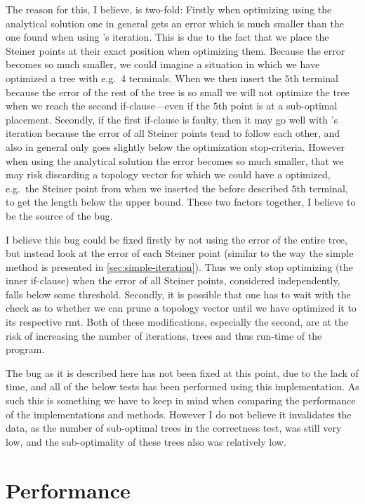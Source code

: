 The reason for this, I believe, is two-fold: Firstly when optimizing using the
analytical solution one in general gets an error which is much smaller than the
one found when using \citeauthor{smith1992}'s iteration. This is due to the fact
that we place the Steiner points at their exact position when optimizing them.
Because the error becomes so much smaller, we could imagine a situation in which
we have optimized a tree with e.g.\ $4$ terminals. When we then insert the $5$th
terminal because the error of the rest of the tree is so small we will not
optimize the tree when we reach the second if-clause---even if the $5$th point
is at a sub-optimal placement. Secondly, if the first if-clause is faulty, then
it may go well with \citeauthor{smith1992}'s iteration because the error of all
Steiner points tend to follow each other, and also in general only goes slightly
below the optimization stop-criteria. However when using the analytical solution
the error becomes so much smaller, that we may risk discarding a topology vector
for which we could have a optimized, e.g.\ the Steiner point from when we
inserted the before described $5$th terminal, to get the length below the upper
bound. These two factors together, I believe to be the source of the bug.

I believe this bug could be fixed firstly by not using the error of the entire
tree, but instead look at the error of each Steiner point (similar to
the way the simple method is presented in \cref{sec:simple-iteration}). Thus we
only stop optimizing (the inner if-clause) when the error of all Steiner points,
considered independently, falls below some threshold. Secondly, it is possible
that one has to wait with the check as to whether we can prune a topology vector
until we have optimized it to its respective \ac{rmt}. Both of these
modifications, especially the second, are at the risk of increasing the number
of iterations, trees and thus run-time of the program.

The bug as it is described here has not been fixed at this point, due to the
lack of time, and all of the below tests has been performed using this
implementation. As such this is something we have to keep in mind when comparing
the performance of the implementations and methods. However I do not believe it
invalidates the data, as the number of sub-optimal trees in the correctness test,
was still very low, and the sub-optimality of these trees also was relatively
low.

\section{Performance}
\label{sec:performance}

